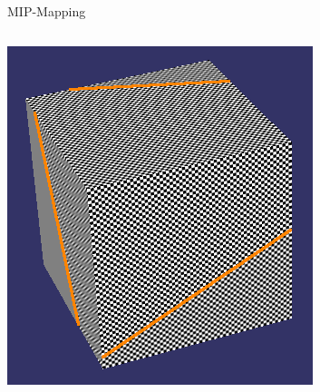 \documentclass[utf8,stillsansserifmath,fleqn,t]{beamer}
\begin{document}
\begin{frame}
\frametitle{\insertsection}
MIP-Mapping
\begin{columns}
\centerline{%
                   {\includegraphics[width=.9\textwidth]{./fig/mipmap-trilinear-1.png}}}

\end{columns}
\end{frame}
\end{document}
